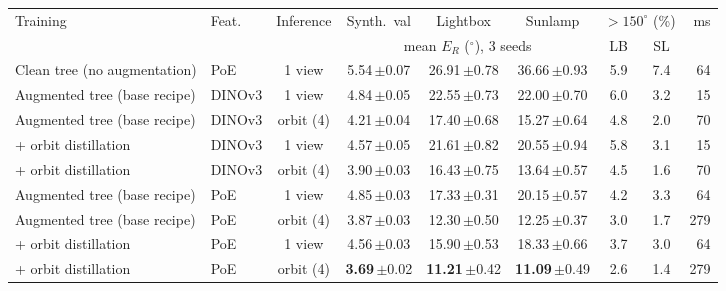 \begin{tabular}{@{}llc ccc cc r@{}}
\toprule
Training & Feat. & Inference & Synth.\ val & Lightbox & Sunlamp & \multicolumn{2}{c}{${>}150^\circ$ (\%)} & ms \\
\cmidrule(lr){7-8} & & & \multicolumn{3}{c}{mean $E_R$ ($^\circ$), 3 seeds} & LB & SL & \\
\midrule
Clean tree (no augmentation) & PoE & 1 view & 5.54\,{\scriptsize$\pm$0.07} & 26.91\,{\scriptsize$\pm$0.78} & 36.66\,{\scriptsize$\pm$0.93} & 5.9 & 7.4 & 64 \\
\midrule
Augmented tree (base recipe) & DINOv3 & 1 view & 4.84\,{\scriptsize$\pm$0.05} & 22.55\,{\scriptsize$\pm$0.73} & 22.00\,{\scriptsize$\pm$0.70} & 6.0 & 3.2 & 15 \\
Augmented tree (base recipe) & DINOv3 & orbit (4) & 4.21\,{\scriptsize$\pm$0.04} & 17.40\,{\scriptsize$\pm$0.68} & 15.27\,{\scriptsize$\pm$0.64} & 4.8 & 2.0 & 70 \\
+ orbit distillation & DINOv3 & 1 view & 4.57\,{\scriptsize$\pm$0.05} & 21.61\,{\scriptsize$\pm$0.82} & 20.55\,{\scriptsize$\pm$0.94} & 5.8 & 3.1 & 15 \\
+ orbit distillation & DINOv3 & orbit (4) & 3.90\,{\scriptsize$\pm$0.03} & 16.43\,{\scriptsize$\pm$0.75} & 13.64\,{\scriptsize$\pm$0.57} & 4.5 & 1.6 & 70 \\
\midrule
Augmented tree (base recipe) & PoE & 1 view & 4.85\,{\scriptsize$\pm$0.03} & 17.33\,{\scriptsize$\pm$0.31} & 20.15\,{\scriptsize$\pm$0.57} & 4.2 & 3.3 & 64 \\
Augmented tree (base recipe) & PoE & orbit (4) & 3.87\,{\scriptsize$\pm$0.03} & 12.30\,{\scriptsize$\pm$0.50} & 12.25\,{\scriptsize$\pm$0.37} & 3.0 & 1.7 & 279 \\
+ orbit distillation & PoE & 1 view & 4.56\,{\scriptsize$\pm$0.03} & 15.90\,{\scriptsize$\pm$0.53} & 18.33\,{\scriptsize$\pm$0.66} & 3.7 & 3.0 & 64 \\
+ orbit distillation & PoE & orbit (4) & \textbf{3.69}\,{\scriptsize$\pm$0.02} & \textbf{11.21}\,{\scriptsize$\pm$0.42} & \textbf{11.09}\,{\scriptsize$\pm$0.49} & 2.6 & 1.4 & 279 \\
\bottomrule
\end{tabular}